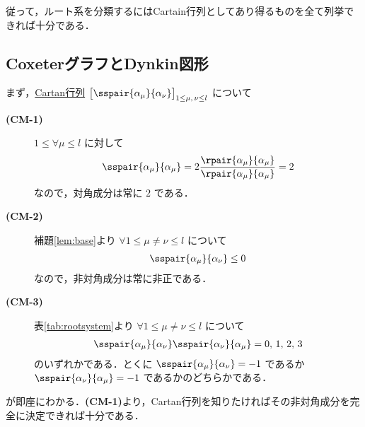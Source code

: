 \documentclass[rep_main]{subfiles}
\begin{document}
従って，ルート系を分類するにはCartain行列としてあり得るものを全て列挙できれば十分である．

\subsection{CoxeterグラフとDynkin図形}

まず，\hyperref[def:Cartan-matrix]{Cartan行列} $\bigl[ \sspair{\alpha_\mu}{\alpha_\nu} \bigr]_{1 \le \mu,\, \nu \le l}$ について
\begin{description}
	\item[\textbf{(CM-1)}] \label{Cartan-matrix-classification}
	$1 \le \forall \mu \le l$ に対して
	\begin{align}
		\sspair{\alpha_\mu}{\alpha_\mu} = 2\frac{\rpair{\alpha_\mu}{\alpha_\mu}}{\rpair{\alpha_\mu}{\alpha_\mu}} = 2
	\end{align}
	なので，対角成分は常に $2$ である．
	\item[\textbf{(CM-2)}] 補題\ref{lem:base}より $\forall 1 \le \mu \neq \nu \le l$ について
	\begin{align}
		\sspair{\alpha_\mu}{\alpha_\nu} \le 0
	\end{align}
	なので，非対角成分は常に非正である．
	\item[\textbf{(CM-3)}] 表\ref{tab:rootsystem}より $\forall 1 \le \mu \neq \nu \le l$ について
	\begin{align}
		\sspair{\alpha_\mu}{\alpha_\nu}\sspair{\alpha_\nu}{\alpha_\mu} = 0,\, 1,\, 2,\, 3
	\end{align}
	のいずれかである．とくに $\sspair{\alpha_\mu}{\alpha_\nu} = -1$ であるか $\sspair{\alpha_\nu}{\alpha_\mu} = -1$ であるかのどちらかである．
\end{description}
が即座にわかる．\textsf{\textbf{(CM-1)}}より，Cartan行列を知りたければその非対角成分を完全に決定できれば十分である．
\end{document}
